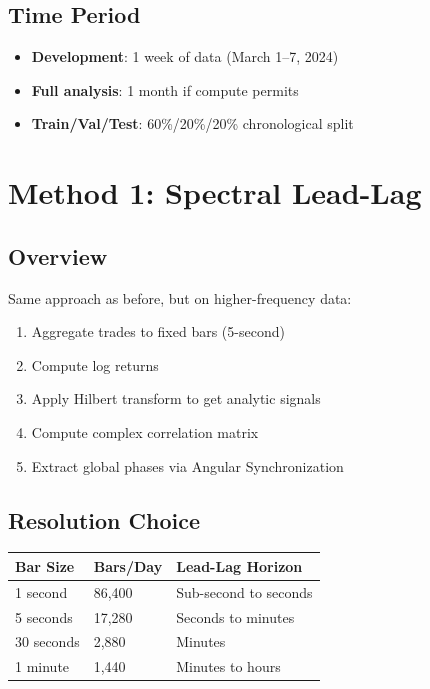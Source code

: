 \documentclass[11pt, a4paper]{article}
\begin{document}
\subsection{Time Period}

\begin{itemize}
    \item \textbf{Development}: 1 week of data (March 1--7, 2024)
    \item \textbf{Full analysis}: 1 month if compute permits
    \item \textbf{Train/Val/Test}: 60\%/20\%/20\% chronological split
\end{itemize}

\section{Method 1: Spectral Lead-Lag}

\subsection{Overview}

Same approach as before, but on higher-frequency data:
\begin{enumerate}
    \item Aggregate trades to fixed bars (5-second)
    \item Compute log returns
    \item Apply Hilbert transform to get analytic signals
    \item Compute complex correlation matrix
    \item Extract global phases via Angular Synchronization
\end{enumerate}

\subsection{Resolution Choice}

\begin{center}
\begin{tabular}{lll}
\toprule
\textbf{Bar Size} & \textbf{Bars/Day} & \textbf{Lead-Lag Horizon} \\
\midrule
1 second & 86,400 & Sub-second to seconds \\
5 seconds & 17,280 & Seconds to minutes \\
30 seconds & 2,880 & Minutes \\
1 minute & 1,440 & Minutes to hours \\
\bottomrule
\end{tabular}
\end{center}
\end{document}
